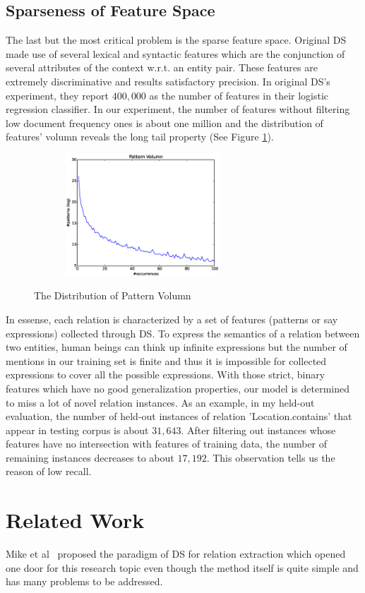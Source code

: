 \documentclass[10pt]{article} %
\theoremstyle{definition}
\theoremstyle{definition}
\begin{document}
\subsection{Sparseness of Feature Space}
The last but the most critical problem is the sparse feature space. 
Original DS made use of several lexical and syntactic features which are the conjunction of several attributes of the context w.r.t. an entity pair. 
These features are extremely discriminative and results satisfactory precision. 
In original DS's experiment, they report $400,000$ as the number of features in their logistic regression classifier. 
In our experiment, the number of features without filtering low document frequency ones is about one million and the distribution of features' volumn reveals the long tail property (See Figure \ref{fig:pv}). 
\begin{figure}
\centering
\includegraphics[width=3.2in,height=1.8in]{pv.eps}
\label{fig:pv}
\caption{The Distribution of Pattern Volumn}
\end{figure}
In essense, each relation is characterized by a set of features (patterns or say expressions) collected through DS. 
To express the semantics of a relation between two entities, human beings can think up infinite expressions 
but the number of mentions in our training set is finite and thus it is impossible for collected expressions to cover all the possible expressions. 
With those strict, binary features which have no good generalization properties, our model is determined to miss a lot of novel relation instances. 
As an example, in my held-out evaluation, the number of held-out instances of relation 'Location.contains' that appear in testing corpus is about $31,643$. 
After filtering out instances whose features have no intersection with features of training data, the number of remaining instances decreases to about $17,192$. 
This observation tells us the reason of low recall. 



\section{Related Work}
Mike et al~\cite{mintz} proposed the paradigm of DS for relation extraction which opened one door for this research topic even though the method itself is quite simple and has many problems to be addressed. 
\end{document}
